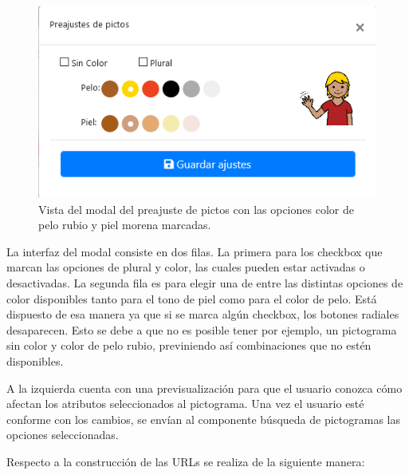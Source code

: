 \begin{figure}[h!]
	\centering
	\includegraphics[width=0.7\linewidth]{Imagenes/Bitmap/modalPreajustePicto}
	\caption{Vista del modal del preajuste de pictos con las opciones color de pelo rubio y piel morena marcadas.}
	\label{fig:modalpreajustepicto}
\end{figure}



La interfaz del modal consiste en dos filas. La primera para los checkbox que marcan las opciones de plural y color, las cuales pueden estar activadas o desactivadas. La segunda fila es para elegir una de entre las distintas opciones de color disponibles tanto para el tono de piel como para el color de pelo. Está dispuesto de esa manera ya que si se marca algún checkbox, los botones radiales desaparecen. Esto se debe a que no es posible tener por ejemplo, un pictograma sin color y color de pelo rubio, previniendo así combinaciones que no estén disponibles.

A la izquierda cuenta con una previsualización para que el usuario conozca cómo afectan los atributos seleccionados al pictograma. Una vez el usuario esté conforme con los cambios, se envían al componente búsqueda de pictogramas las opciones seleccionadas.

Respecto a la construcción de las URLs se realiza de la siguiente manera:

